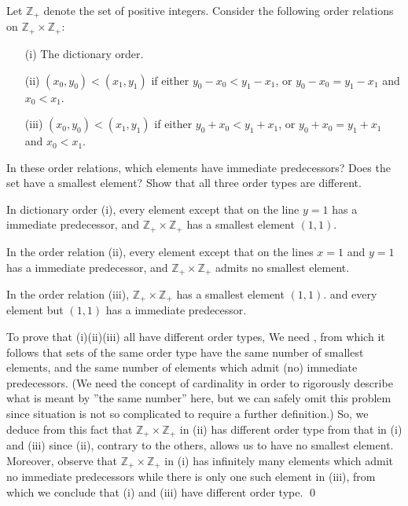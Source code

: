 \documentclass[a4paper,12pt]{article}
\begin{document}
\begin{exe}
	Let \( \mathbb{Z}_{+} \) denote the set of positive integers.
	Consider the following order relations on \( \mathbb{Z}_{+} \times \mathbb{Z}_{+} \):
	\begin{enumerate}
		\item[(i)]
		      The dictionary order.
		      
		\item[(ii)]
		      \( (x_0,y_0) < (x_1,y_1) \)
		      if either 
		      \( y_0 - x_0 < y_1 - x_1 \),
		      or
		      \( y_0 - x_0 = y_1 - x_1 \) and \( x_0 < x_1 \).
		      
		\item[(iii)]
		      \( (x_0,y_0) < (x_1,y_1) \)
		      if either 
		      \( y_0 + x_0 < y_1 + x_1 \),
		      or
		      \( y_0 + x_0 = y_1 + x_1 \) and \( x_0 < x_1 \).
	\end{enumerate}
	In these order relations, which elements have immediate predecessors?
	Does the set have a smallest element?
	Show that all three order types are different.
\end{exe}\begin{sol}%
	In dictionary order (i), every element except that on the line \( y=1 \)
	has a immediate predecessor, and
	\( \mathbb{Z}_{+} \times \mathbb{Z}_{+} \)
	has a smallest element \( (1,1)\).
	
	In the order relation (ii),
	every element except that on the lines \( x=1 \) and \( y=1 \)
	has a immediate predecessor,
	and
	\( \mathbb{Z}_{+} \times \mathbb{Z}_{+} \)
	admits no smallest element.
	
	In the order relation (iii),
	\( \mathbb{Z}_{+} \times \mathbb{Z}_{+} \)
	has a smallest element \( (1,1)\).
	and every element but \( (1,1) \) has a immediate predecessor.
	
	To prove that (i)(ii)(iii) all have different order types,
	We need ,
	from which it follows that sets of the same order type have
	the same number of smallest elements,
	and the same number of elements which admit (no) immediate predecessors.
	(We need the concept of cardinality in order to rigorously describe what is meant by  ''the same number'' here, but we can safely omit this problem since situation is not so complicated to require a further definition.)
	So, we deduce from this fact that \( \mathbb{Z}_{+} \times \mathbb{Z}_{+} \) in (ii) has different order type from that in (i) and (iii)
	since (ii), contrary to the others, allows us to have no smallest element.
	Moreover, observe that
	\( \mathbb{Z}_{+} \times \mathbb{Z}_{+} \) in (i)
	has infinitely many elements which admit no immediate predecessors
	while there is only one such element in (iii),
	from which we conclude that (i) and (iii) have different order type.
	\qed\end{sol}
\end{document}

